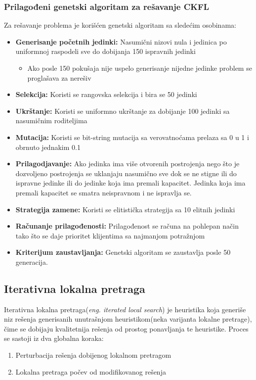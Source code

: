 \documentclass[a4paper]{article}
\begin{document}
\subsubsection{Prilagođeni genetski algoritam za rešavanje CKFL}

Za rešavanje problema je korišćen genetski algoritam sa sledećim osobinama:

\begin{itemize}
\item \textbf{Generisanje početnih jedinki:} Nasumični nizovi nula i jedinica po uniformnoj raspodeli sve do dobijanja 150 ispravnih jedinki
	\begin{itemize}
		\item Ako posle 150 pokušaja nije uspelo generisanje nijedne jedinke problem se proglašava za nerešiv
	\end{itemize}
\item \textbf{Selekcija:} Koristi se rangovska selekcija i bira se 50 jedinki
\item \textbf{Ukrštanje:} Koristi se uniformno ukrštanje za dobijanje 100 jedinki sa nasumičnim roditeljima
\item \textbf{Mutacija:} Koristi se bit-string mutacija sa verovatnoćama prelaza sa 0 u 1 i obrnuto jednakim 0.1
\item \textbf{Prilagodjavanje:} Ako jedinka ima više otvorenih postrojenja nego što je dozvoljeno postrojenja se uklanjaju nasumično sve dok se ne stigne ili do ispravne jedinke ili do jedinke koja ima premali kapacitet. Jedinka koja ima premali kapacitet se smatra neispravnom i ne ispravlja se.
\item \textbf{Strategija zamene:} Koristi se elitistička strategija sa 10 elitnih jedinki
\item \textbf{Računanje prilagođenosti:}  Prilagođenost se računa na pohlepan način tako što se daje prioritet klijentima sa najmanjom potražnjom
\item \textbf{Kriterijum zaustavljanja:} Genetski algoritam se zaustavlja posle 50 generacija.
\end{itemize}

\subsection{Iterativna lokalna pretraga}

Iterativna lokalna pretraga(\emph{eng. iterated local search}) je heuristika koja generiše niz rešenja generisanih unutrašnjom heuristikom(neka varijanta lokalne pretrage), čime se dobijaju kvalitetnija rešenja od prostog ponavljanja te heuristike\cite{lourenccoils}. 
Proces se sastoji iz dva globalna koraka:
\begin{enumerate}
\item Perturbacija rešenja dobijenog lokalnom pretragom
\item Lokalna pretraga počev od modifikovanog rešenja
\end{enumerate}
\end{document}
